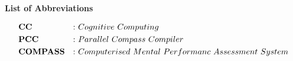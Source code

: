 \begin{center}
\textbf{\fontsize{17}{32}\selectfont List of Abbreviations}
\end{center}
\begin{align}
&{\bf CC} &:&~Cognitive~Computing \nonumber \\
&{\bf PCC} &:&~Parallel~Compass~Compiler \nonumber\\
&{\bf COMPASS} &:&~Computerised~Mental~Performanc~ Assessment~System\nonumber\\
\nonumber
\end{align}